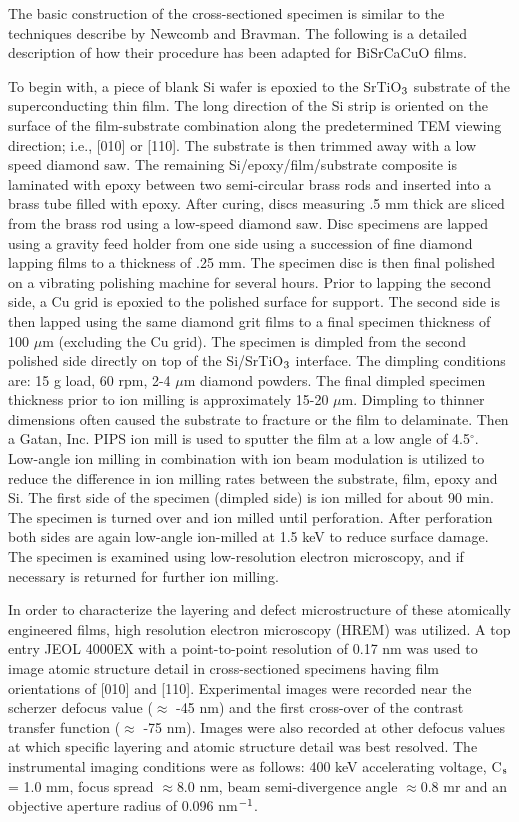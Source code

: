 The basic construction of the cross-sectioned specimen is similar to
the techniques describe by Newcomb\cite{newcomb} and
Bravman.\cite{bravman} The following is a detailed description of how
their procedure has been adapted for BiSrCaCuO films.

To begin with, a piece of blank Si wafer is epoxied to the SrTiO$\rm
_3$ substrate of the superconducting thin film.  The long direction of
the Si strip is oriented on the surface of the film-substrate
combination along the predetermined TEM viewing direction; i.e., [010]
or [110].  The substrate is then trimmed away with a low speed diamond
saw. The remaining Si/epoxy/film/substrate composite is laminated with
epoxy between two semi-circular brass rods and inserted into a brass
tube filled with epoxy.  After curing, discs measuring .5 mm thick are
sliced from the brass rod using a low-speed diamond saw.  Disc
specimens are lapped using a gravity feed holder from one side using a
succession of fine diamond lapping films to a thickness of .25 mm.
The specimen disc is then final polished on a vibrating polishing
machine for several hours.  Prior to lapping the second side, a Cu
grid is epoxied to the polished surface for support. The second side
is then lapped using the same diamond grit films to a final specimen
thickness of 100 $\mu$m (excluding the Cu grid).  The specimen is
dimpled from the second polished side directly on top of the
Si/SrTiO$\rm _3$ interface. The dimpling conditions are: 15 g load, 60
rpm, 2-4 $\mu$m diamond powders.  The final dimpled specimen thickness
prior to ion milling is approximately 15-20 $\mu$m.  Dimpling to
thinner dimensions often caused the substrate to fracture or the film
to delaminate.  Then a Gatan, Inc. PIPS ion mill is used to sputter
the film at a low angle of 4.5$^{\circ}$.  Low-angle ion milling in
combination with ion beam modulation is utilized to reduce the
difference in ion milling rates between the substrate, film, epoxy and
Si.  The first side of the specimen (dimpled side) is ion milled for
about 90 min.  The specimen is turned over and ion milled until
perforation.  After perforation both sides are again low-angle
ion-milled at 1.5 keV to reduce surface damage.  The specimen is
examined using low-resolution electron microscopy, and if necessary is
returned for further ion milling.

In order to characterize the layering and defect microstructure of
these atomically engineered films, high resolution electron microscopy
(HREM) was utilized.  A top entry JEOL 4000EX with a point-to-point
resolution of 0.17 nm was used to image atomic structure detail in
cross-sectioned specimens having film orientations of [010] and [110].
Experimental images were recorded near the scherzer defocus value
($\approx$ -45 nm) and the first cross-over of the contrast transfer
function ($\approx$ -75 nm).  Images were also recorded at other
defocus values at which specific layering and atomic structure detail
was best resolved.  The instrumental imaging conditions were as
follows: 400 keV accelerating voltage, C$\rm _s$ = 1.0 mm, focus
spread $\approx$8.0 nm, beam semi-divergence angle $\approx$0.8 mr and
an objective aperture radius of 0.096 nm$\rm ^{-1}$.


